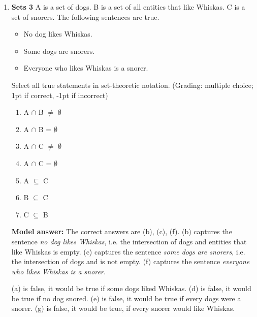 \documentclass[a4,11pt]{article}
\begin{document}
\begin{enumerate}[leftmargin = 12pt]
        \begin{enumerate}[noitemsep]
        \item A $\cap$ B = $\emptyset$ (1pt checked / -1pt unchecked)
	\item A $\cup$ B = $\emptyset$  (-1pt checked / 1pt unchecked)
        \item A $\subset$ B (-1pt checked / 1pt unchecked)
	\end{enumerate}	

{\bf Model answer:}  The correct answer is  A $\subset$ B because every member of the set of parrots is a member of the set of entities who like to sing.

\item {\bf Sets 3}  A is a set of dogs. B is a set of all entities that like Whiskas. C is a set of snorers. The following sentences are true. 

\begin{itemize}[noitemsep]
\item No dog likes Whiskas.
\item Some dogs are snorers.
\item Everyone who likes Whiskas is a snorer.
\end{itemize}

Select all true statements in set-theoretic notation. (Grading: multiple choice; 1pt if correct, -1pt if incorrect)

\begin{enumerate}
\item A $\cap$ B $\neq$ $\emptyset$
\item A $\cap$ B = $\emptyset$
\item A $\cap$ C $\neq$ $\emptyset$
\item A $\cap$ C = $\emptyset$
\item A $\subseteq$ C 
\item B $\subseteq$ C 
\item C $\subseteq$ B
\end{enumerate}

{\bf Model answer:} The correct answers are (b), (c), (f). (b) captures the sentence \textit{no dog likes Whiskas}, i.e. the intersection of dogs and entities that like Whiskas is empty. (c) captures the sentence \textit{some dogs are snorers}, i.e. the intersection of dogs and is not empty. (f) captures the sentence \textit{everyone who likes Whiskas is a snorer}.

(a) is false, it would be true if some dogs liked Whiskas. 
(d) is false, it would be true if no dog snored. 
(e) is false, it would be true if every dogs were a snorer. 
(g) is false, it would be true, if every snorer would like Whiskas.



\end{enumerate}
\end{document}
